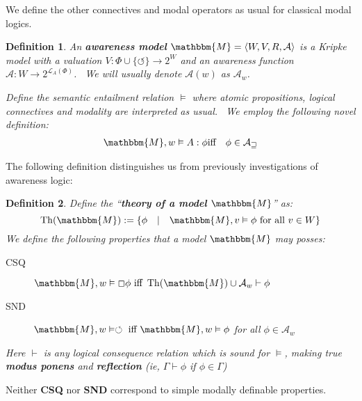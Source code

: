 \documentclass{acmconf}
\newcommand{\assign}{:=}
\newcommand{\tmop}[1]{\ensuremath{\operatorname{#1}}}
\newcommand{\tmstrong}[1]{\textbf{#1}}
\newcommand{\tmtextbf}[1]{{\bfseries{#1}}}
\newenvironment{descriptiondash}{\begin{description} }{\end{description}}
\newtheorem{definition}{Definition}
\begin{document}
We define the other connectives and modal operators as usual for classical
modal logics.

\begin{definition}
  \label{awarenessmodels}An {\tmstrong{awareness model}} $\mathbbm{M}= \langle
  W, V, R, \mathcal{A} \rangle$ is a Kripke model with a valuation $V : \Phi
  \cup \{\circlearrowleft\} \rightarrow 2^W$ and an awareness function
  $\mathcal{A} : W \rightarrow 2^{\mathcal{L}_A (\Phi)}$. \ We will usually
  denote $\mathcal{A} (w)$ as $\mathcal{A}_w$.
  
  
  
  Define the semantic entailment relation $\vDash$ where atomic propositions,
  logical connectives and modality are interpreted as usual. \ We employ the
  following novel definition:
  \begin{eqnarray*}
    \mathbbm{M}, w \vDash A : \phi & \text{iff} & \phi \in \mathcal{A_w}
  \end{eqnarray*}
\end{definition}

The following definition distinguishes us from previously investigations of
awareness logic:

\begin{definition}
  Define the ``\tmtextbf{theory of a model} $\mathbbm{M}$'' as:
  \[ \tmop{Th} (\mathbbm{M}) \assign \{\phi \hspace{1em} | \hspace{1em}
     \mathbbm{M}, v \vDash \phi \text{ for all } v \in W\} \]
  We define the following properties that a model $\mathbbm{M}$ may posses:
  
  \begin{descriptiondash}
    \item[CSQ] $\mathbbm{M}, w \vDash \Box \phi \text{ iff } \tmop{Th}
    (\mathbbm{M}) \cup \mathcal{A}_w \vdash \phi$
    
    \item[SND] $\mathbbm{M}, w \vDash \circlearrowleft \text{ iff }
    \mathbbm{M}, w \vDash \phi$ for all $\phi \in \mathcal{A}_w$
  \end{descriptiondash}
  
  Here $\vdash$ is any logical consequence relation which is sound for
  $\vDash$, making true \tmtextbf{modus ponens} and \tmtextbf{reflection} (ie,
  $\Gamma \vdash \phi$ if $\phi \in \Gamma$)
\end{definition}

Neither \tmtextbf{CSQ} nor \tmtextbf{SND} correspond to simple modally
definable properties.
\end{document}

